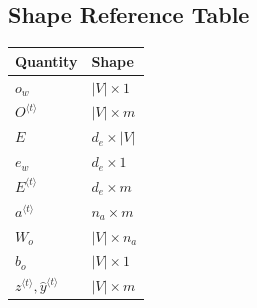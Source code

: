 \subsection{Shape Reference Table}

\begin{center}
\begin{tabular}{ll}
\toprule
Quantity & Shape \\
\midrule
$o_w$ & $\lvert V\rvert \times 1$ \\
$O^{\langle t\rangle}$ & $\lvert V\rvert \times m$ \\
$E$ & $d_e \times \lvert V\rvert$ \\
$e_w$ & $d_e \times 1$ \\
$E^{\langle t\rangle}$ & $d_e \times m$ \\
$a^{\langle t\rangle}$ & $n_a \times m$ \\
$W_o$ & $\lvert V\rvert \times n_a$ \\
$b_o$ & $\lvert V\rvert \times 1$ \\
$z^{\langle t\rangle},\hat{y}^{\langle t\rangle}$ & $\lvert V\rvert \times m$ \\
\bottomrule
\end{tabular}
\end{center}
